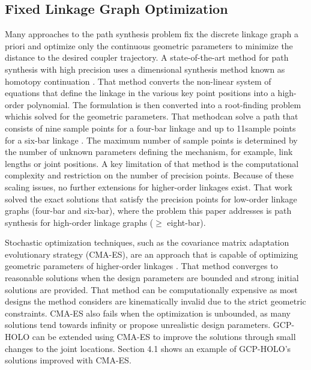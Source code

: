 \subsection{Fixed Linkage Graph Optimization}
Many approaches to the path synthesis problem fix the discrete linkage graph a priori and optimize only the continuous geometric parameters to minimize the distance to the desired coupler trajectory. A state-of-the-art method for path synthesis with high precision uses a dimensional synthesis method known as homotopy continuation \cite{plecnik_computational_2016}. That method converts the non-linear system of equations that define the linkage in the various key point positions into a high-order polynomial. The formulation is then converted into a root-finding problem whichis solved for the geometric parameters. That methodcan solve a path that consists of nine sample points for a four-bar linkage \cite{wampler_complete_1992} and up to 11sample points for a six-bar linkage \cite{plecnik_design_2016}. The maximum number of sample points is determined by the number of unknown parameters defining the mechanism, for example, link lengths or joint positions. A key limitation of that method is the computational complexity and restriction on the number of precision points. Because of these scaling issues, no further extensions for higher-order linkages exist. That work solved the exact solutions that satisfy the precision points for low-order linkage graphs (four-bar and six-bar), where the problem this paper addresses is path synthesis for high-order linkage graphs ($\geq$ eight-bar). 

Stochastic optimization techniques, such as the covariance matrix adaptation evolutionary strategy (CMA-ES), are an approach that is capable of optimizing geometric parameters of higher-order linkages \cite{thomaszewski_computational_2014}. That method converges to reasonable solutions when the design parameters are bounded and strong initial solutions are provided. That method can be computationally expensive as most designs the method considers are kinematically invalid due to the strict geometric constraints. CMA-ES also fails when the optimization is unbounded, as many solutions tend towards infinity or propose unrealistic design parameters. GCP-HOLO can be extended using CMA-ES to improve the solutions through small changes to the joint locations. Section 4.1 shows an example of GCP-HOLO’s solutions improved with CMA-ES. 

